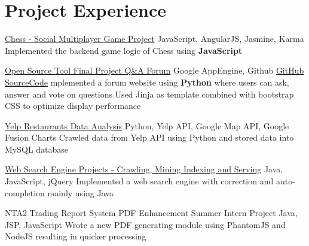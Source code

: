 \documentclass[11pt,a4paper,sans]{moderncv}   %
\begin{document}
\section{Project Experience}
\renewcommand{\baselinestretch}{1.0}
{\href{https://github.com/cz764/Chess}{Chess - Social Multiplayer Game Project}}
{JavaScript, AngularJS, Jasmine, Karma}
{}{}
{
{Implemented the backend game logic of Chess using \textbf{JavaScript}}
}

{\href{http://chenzhuost.appspot.com/}{Open Source Tool Final Project Q\&A Forum}}
{Google AppEngine, Github}
{\href{https://github.com/cz764/OpenSourceTool_FinalProject}{GitHub SourceCode}}{}
{
{mplemented a forum website using \textbf{Python} where users can ask, answer and vote on questions}
\newline
{Used Jinja as template combined with bootstrap CSS to optimize display performance}
}



{\href{https://github.com/cz764/DealingWithData_FinalProject}{Yelp Restaurants Data Analysis}}
{Python, Yelp API, Google Map API, Google Fusion Charts}
{}{}
{
{Crawled data from Yelp API using Python and stored data into MySQL database}
}


{\href{https://github.com/patronpengiun/WebSearchEngine}{Web Search Engine Projects - Crawling, Mining Indexing and Serving}}
{Java, JavaScript, jQuery}
{}{}
{{Implemented a web search engine with correction and auto-completion mainly using Java}
}

{NTA2 Trading Report System PDF Enhancement Summer Intern Project}
{Java, JSP, JavaScript}
{}{}
{{Wrote a new PDF generating module using PhantomJS and NodeJS resulting in quicker processing}
}
\end{document}
